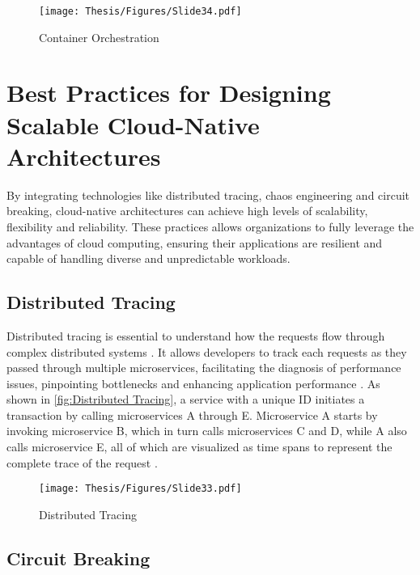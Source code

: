 \captionsetup{justification=centering}
\begin{figure}[h]
\centering
\texttt{[image: Thesis/Figures/Slide34.pdf]}
\caption{\label{fig:Container Orchestration}Container Orchestration \cite{carrion2022Kubernetes}}
\end{figure}


\section{Best Practices for Designing Scalable Cloud-Native Architectures}

By integrating technologies like distributed tracing, chaos engineering and circuit breaking, cloud-native architectures can achieve high levels of scalability, flexibility and reliability. These practices allows organizations to fully leverage the advantages of cloud computing, ensuring their applications are resilient and capable of handling diverse and unpredictable workloads. \cite{r16}

\subsection{Distributed Tracing}

Distributed tracing is essential to understand how the requests flow through complex distributed systems \cite{r24}. It allows developers to track each requests as they passed through multiple microservices, facilitating the diagnosis of performance issues, pinpointing bottlenecks and enhancing application performance \cite{r25}. As shown in \autoref{fig:Distributed Tracing}, a service with a unique ID initiates a transaction by calling microservices A through E. Microservice A starts by invoking microservice B, which in turn calls microservices C and D, while A also calls microservice E, all of which are visualized as time spans to represent the complete trace of the request \cite{logz2024tracing}.

\clearpage

\captionsetup{justification=centering}
\begin{figure}[h]
\centering
\texttt{[image: Thesis/Figures/Slide33.pdf]}
\caption{\label{fig:Distributed Tracing}Distributed Tracing \cite{logz2024tracing}}
\end{figure}


\subsection{Circuit Breaking}


